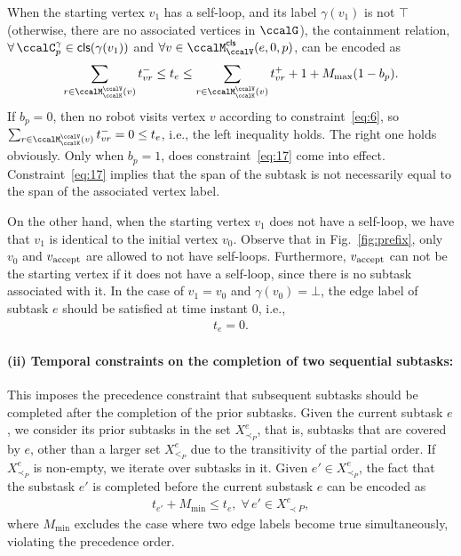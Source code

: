 \documentclass[Afour,sageh,times]{sagej}
\newcommand{\clause}[1]{\mathsf{cls}(#1)}
\newcommand{\vertex}[1]{v_{\textup{#1}}}
\begin{document}
{{{When the starting vertex $v_1$ has a self-loop, and its label $\gamma(v_1)$ is not  $\top$ (otherwise, there are no associated vertices in $\ccalG$), the containment relation, $\forall\, \ccalC_p^{\gamma} \in \clause{\gamma(v_1)}$ and $\forall v \in \ccalM^\mathsf{cls}_\ccalV(e,0,p)$, can be encoded as
\begingroup\makeatletter\def\f@size{10}\check@mathfonts
\def\maketag@@@#1{\hbox{\m@th\normalsize\normalfont#1}}%
  \begin{align}
 \sum_{r\in \ccalM^\ccalV_{\ccalK}(v)} t_{vr}^-  \leq  t_e \leq
    \sum_{r\in \ccalM^\ccalV_{\ccalK}(v)} t_{vr}^+ + 1  + M_{\text{max}} (1 - b_{p}). \label{eq:17}
  \end{align}
  \endgroup
  If $b_p=0$, then no robot visits vertex $v$ according to constraint~\eqref{eq:6}, so~ $ \sum_{r\in \ccalM^\ccalV_{\ccalK}(v)} t_{vr}^- = 0 \leq t_e$, i.e., the left inequality holds. The right one holds obviously. Only when $b_p=1$, does constraint~\eqref{eq:17} come into effect. Constraint~\eqref{eq:17} implies that the span of the subtask is not necessarily equal to the span of the associated vertex label.

  On the other hand, when the starting vertex $v_1$ does not have a self-loop, we have that $v_1$ is identical to the initial vertex $v_0$. Observe that in Fig.~\ref{fig:prefix}, only $v_0$ and $\vertex{accept}$ are allowed to not have self-loops. Furthermore, $\vertex{accept}$ can not be the starting vertex if it does not have a self-loop, since there is no subtask associated with it. In the case of $v_1 = v_0$ and $\gamma(v_0) = \bot$, the edge label of subtask $e$ should be satisfied at time instant 0, i.e.,
  \begingroup\makeatletter\def\f@size{10}\check@mathfonts
\def\maketag@@@#1{\hbox{\m@th\normalsize\normalfont#1}}%
  \begin{align}
 t_e = 0. \label{eq:tis0}
  \end{align}
  \endgroup


\paragraph{(ii) Temporal constraints on the completion of two sequential subtasks:}\label{sec:constraintonedge}
This imposes the precedence constraint that subsequent subtasks should be completed after the completion of the prior subtasks.   Given the current subtask $e$, we consider its prior subtasks in the set $X^e_{\prec_{P}}$, that is, subtasks that are covered by $e$, other than a larger set $X^e_{<_{P}}$ due to the transitivity of the partial order.
If $X^e_{\prec_{P}}$ is non-empty, we iterate over subtasks in it.  Given $e' \in X^e_{\prec_{P}}$, the fact that the substask $e'$ is completed before the current substask $e$ can be encoded as
\begingroup\makeatletter\def\f@size{10}\check@mathfonts
\def\maketag@@@#1{\hbox{\m@th\normalsize\normalfont#1}}%
\begin{align}\label{eq:12}
  t_{e'} +  M_{\text{min}}  \leq t_e, \; \forall \, e' \in X_{\prec P}^e,
\end{align}
\endgroup
where $M_{\text{min}}$ excludes the case where two edge labels become true simultaneously, violating the precedence order.

}}}
\end{document}
